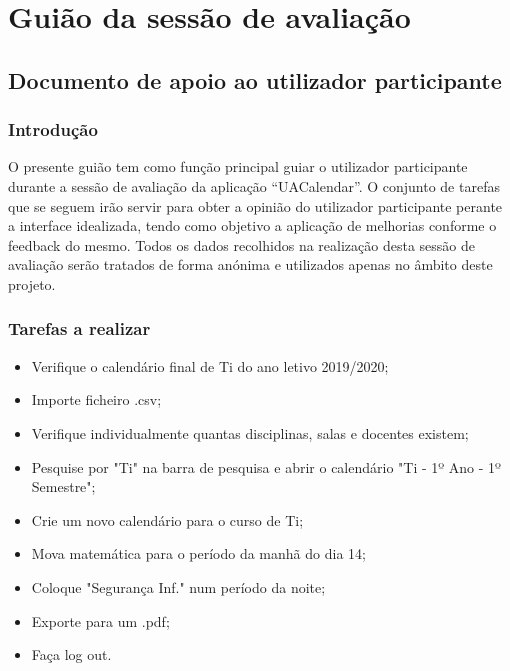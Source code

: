 \documentclass[11pt, twoside]{report}
\begin{document}
	\section*{Guião da sessão de avaliação}
	\subsection*{Documento de apoio ao utilizador participante}
	
	
	\subsubsection*{Introdução}
	O presente guião tem como função principal guiar o utilizador participante durante a sessão de avaliação da aplicação “UACalendar”. O conjunto de tarefas que se seguem irão servir para obter a opinião do utilizador participante perante a interface idealizada, tendo como objetivo a aplicação de melhorias conforme o feedback do mesmo.
	Todos os dados recolhidos na realização desta sessão de avaliação serão tratados de forma anónima e utilizados apenas no âmbito deste projeto.
	
	\subsubsection*{Tarefas a realizar}	
	\begin{itemize}
		\item Verifique o calendário final de Ti do ano letivo 2019/2020;
		\item Importe ficheiro .csv;
		\item Verifique individualmente quantas disciplinas, salas e docentes existem;
		\item Pesquise por "Ti" na barra de pesquisa e abrir o calendário "Ti - 1º Ano - 1º Semestre";
		\item Crie um novo calendário para o curso de Ti;
		\item Mova matemática para o período da manhã do dia 14;
		\item Coloque "Segurança Inf." num período da noite;
		\item Exporte para um .pdf;
		\item Faça log out.
	\end{itemize}
	

	
\end{document}
